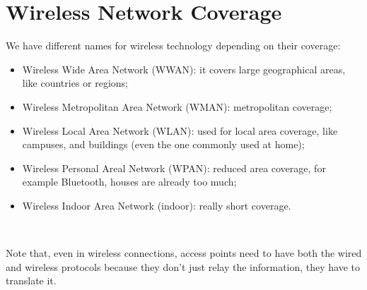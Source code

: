 \section{Wireless Network Coverage}
We have different names for wireless technology depending on their 
coverage:
\begin{itemize}
\item Wireless Wide Area Network (WWAN): it covers large 
  geographical areas, like countries or regions;
\item Wireless Metropolitan Area Network (WMAN): metropolitan 
  coverage;
\item Wireless Local Area Network (WLAN): used for local area 
  coverage, like campuses,  and buildings (even the one commonly used at home);
\item Wireless Personal Areal Network (WPAN): reduced area 
  coverage, for example Bluetooth, houses are already too much;
\item Wireless Indoor Area Network (indoor): really short 
  coverage.
\end{itemize}\

Note that, even in wireless connections, access points need to have both 
the wired and wireless protocols because they don't just relay the information, 
they have to translate it.

